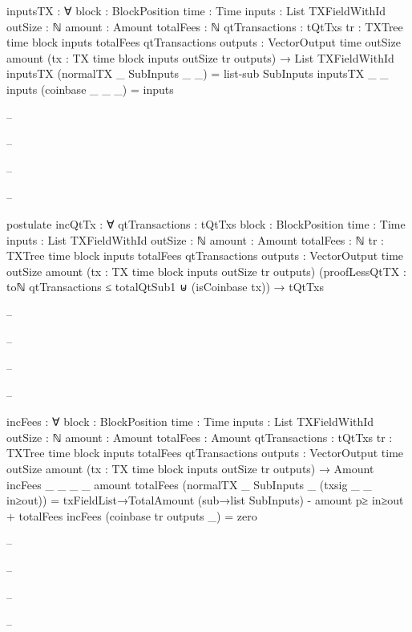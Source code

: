 \documentclass{beamer}
\begin{document}
{\begin{frame}
\begin{code}
        inputsTX : ∀ {block : BlockPosition} {time : Time}
          {inputs : List TXFieldWithId}
          {outSize : ℕ} {amount : Amount}
          {totalFees : ℕ} {qtTransactions : tQtTxs}
          {tr : TXTree time block inputs totalFees qtTransactions}
          {outputs : VectorOutput time outSize amount}
          (tx : TX {time} {block} {inputs} {outSize} tr outputs)
          → List TXFieldWithId
        inputsTX (normalTX _ SubInputs _ _) = list-sub SubInputs
        inputsTX {_} {_} {inputs} (coinbase _ _ _) = inputs

-- \end{code}
-- \end{frame}
-- \begin{frame}
-- \begin{code}

        postulate
          incQtTx : ∀ {qtTransactions : tQtTxs}
            {block : BlockPosition} {time : Time}
            {inputs : List TXFieldWithId}
            {outSize : ℕ} {amount : Amount}
            {totalFees : ℕ}
            {tr : TXTree time block inputs totalFees qtTransactions}
            {outputs : VectorOutput time outSize amount}
            (tx : TX {time} {block} {inputs} {outSize} tr outputs)
            (proofLessQtTX :
                toℕ qtTransactions ≤ totalQtSub1
                ⊎
                (isCoinbase tx))
            → tQtTxs

-- \end{code}
-- \end{frame}
-- \begin{frame}
-- \begin{code}

        incFees : ∀ {block : BlockPosition} {time : Time}
          {inputs : List TXFieldWithId}
          {outSize : ℕ} {amount : Amount}
          {totalFees : Amount} {qtTransactions : tQtTxs}
          {tr : TXTree time block inputs totalFees qtTransactions}
          {outputs : VectorOutput time outSize amount}
          (tx : TX {time} {block} {inputs} {outSize} tr outputs)
          → Amount
        incFees {_} {_} {_} {_} {amount} {totalFees}
          (normalTX _ SubInputs _ (txsig _ _ in≥out)) =
          txFieldList→TotalAmount (sub→list SubInputs)
          - amount p≥ in≥out
          + totalFees
        incFees (coinbase tr outputs _) = zero

-- \end{code}
-- \end{frame}
-- \begin{frame}
-- \begin{code}


\end{code}
\end{frame}}
\end{document}
